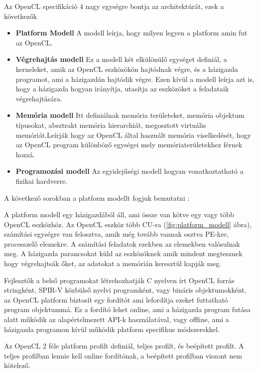 Az OpenCL specifikáció 4 nagy egységre bontja az architektúrát, ezek a következők \cite{spec_archi}
\begin{itemize}
\item \textbf{Platform Modell} A modell leírja, hogy milyen legyen a platform amin fut az OpenCL. 
\item \textbf{Végrehajtás modell} Ez a modell két elkülönülő egységet definiál, a kerneleket, amik az OpenCL eszközökön hajtódnak végre, és a házigazda programot, ami a házigazdán hajtódik végre. Ezen kívül a modell leírja azt is, hogy a házigazda hogyan irányítja, utasítja az eszközöket a feladataik végrehajtására.
\item \textbf{Memória modell} Itt definiálnak memória területeket,  memória objektum típusokat, absztrakt memória hierarchiát, megosztott virtuális memóriát.Leírják hogy az OpenCL által használt memória viselkedését, hogy az OpenCL program különböző egységei mely memóriaterületekhez férnek hozzá.
\item \textbf{Programozási modell} Az egyidejűségi modell hogyan vonatkoztatható a fizikai hardverre.

\end{itemize}

A következő sorokban a platform modellt fogjuk bemutatni \cite{spec_platform} :

A platform modell egy házigazdából áll, ami össze van kötve egy vagy több OpenCL eszközhöz. Az OpenCL eszköz több CU-ra (\ref{fig:platform_modell} ábra), számítási egységre van felosztva, amik még tovább vannak osztva PE-kre, processzelő elemekre. A számítási feladatok ezekben az elemekben valósulnak meg. A házigazda parancsokat küld az eszközöknek amik mindent megtesznek hogy végrehajtsák őket, az adatokat a memórián keresztül kapják meg. 

Fejlesztők a belső programokat létrehozhatják C nyelven írt OpenCL forrás stringként, SPIR-V közbülső nyelvi programként, vagy bináris objektumokként, az OpenCL platform biztosít egy fordítót ami lefordítja ezeket futtatható program objektummá. Ez a fordító lehet online, ami a házigazda program futása alatt működik az alapértelmezett API-k használatával, vagy offline, ami a házigazda programon kívül működik platform specifikus módszerekkel.

Az OpenCL 2 féle platform profilt definiál, teljes profilt, és beépített profilt. A teljes profilban lennie kell online fordítónak, a beépített profilban viszont nem kötelező.


